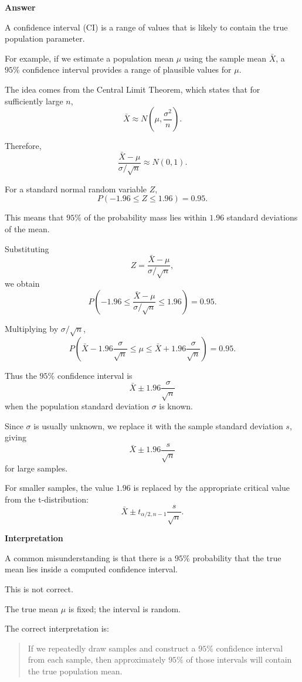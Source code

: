 \documentclass[11pt]{article}
\begin{document}
\textbf{Answer}

A confidence interval (CI) is a range of values that is likely to contain the true population parameter.

For example, if we estimate a population mean \(\mu\) using the sample mean \(\bar X\), a \(95\%\) confidence interval provides a range of plausible values for \(\mu\).

The idea comes from the Central Limit Theorem, which states that for sufficiently large \(n\),
\[
\bar X \approx N\!\left(\mu,\frac{\sigma^2}{n}\right).
\]

Therefore,
\[
\frac{\bar X-\mu}{\sigma/\sqrt n}
\approx N(0,1).
\]

For a standard normal random variable \(Z\),
\[
P(-1.96 \le Z \le 1.96)=0.95.
\]

This means that \(95\%\) of the probability mass lies within \(1.96\) standard deviations of the mean.

Substituting
\[
Z=\frac{\bar X-\mu}{\sigma/\sqrt n},
\]
we obtain
\[
P\!\left(
-1.96
\le
\frac{\bar X-\mu}{\sigma/\sqrt n}
\le
1.96
\right)
=
0.95.
\]

Multiplying by \(\sigma/\sqrt n\),
\[
P\!\left(
\bar X-1.96\frac{\sigma}{\sqrt n}
\le
\mu
\le
\bar X+1.96\frac{\sigma}{\sqrt n}
\right)
=
0.95.
\]

Thus the \(95\%\) confidence interval is
\[
\boxed{
\bar X \pm 1.96\frac{\sigma}{\sqrt n}
}
\]
when the population standard deviation \(\sigma\) is known.

Since \(\sigma\) is usually unknown, we replace it with the sample standard deviation \(s\), giving
\[
\boxed{
\bar X \pm 1.96\frac{s}{\sqrt n}
}
\]
for large samples.

For smaller samples, the value \(1.96\) is replaced by the appropriate critical value from the t-distribution:
\[
\boxed{
\bar X \pm t_{\alpha/2,n-1}\frac{s}{\sqrt n}
}.
\]

\textbf{Interpretation}

A common misunderstanding is that there is a \(95\%\) probability that the true mean lies inside a computed confidence interval.

This is not correct.

The true mean \(\mu\) is fixed; the interval is random.

The correct interpretation is:

\begin{quote}
If we repeatedly draw samples and construct a \(95\%\) confidence interval from each sample, then approximately \(95\%\) of those intervals will contain the true population mean.
\end{quote}
\end{document}
